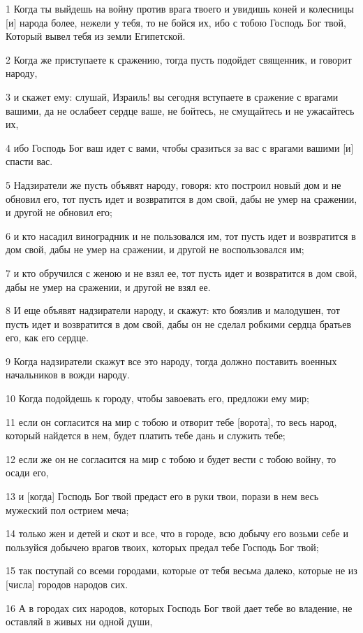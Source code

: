 \par 1 Когда ты выйдешь на войну против врага твоего и увидишь коней и колесницы [и] народа более, нежели у тебя, то не бойся их, ибо с тобою Господь Бог твой, Который вывел тебя из земли Египетской.
\par 2 Когда же приступаете к сражению, тогда пусть подойдет священник, и говорит народу,
\par 3 и скажет ему: слушай, Израиль! вы сегодня вступаете в сражение с врагами вашими, да не ослабеет сердце ваше, не бойтесь, не смущайтесь и не ужасайтесь их,
\par 4 ибо Господь Бог ваш идет с вами, чтобы сразиться за вас с врагами вашими [и] спасти вас.
\par 5 Надзиратели же пусть объявят народу, говоря: кто построил новый дом и не обновил его, тот пусть идет и возвратится в дом свой, дабы не умер на сражении, и другой не обновил его;
\par 6 и кто насадил виноградник и не пользовался им, тот пусть идет и возвратится в дом свой, дабы не умер на сражении, и другой не воспользовался им;
\par 7 и кто обручился с женою и не взял ее, тот пусть идет и возвратится в дом свой, дабы не умер на сражении, и другой не взял ее.
\par 8 И еще объявят надзиратели народу, и скажут: кто боязлив и малодушен, тот пусть идет и возвратится в дом свой, дабы он не сделал робкими сердца братьев его, как его сердце.
\par 9 Когда надзиратели скажут все это народу, тогда должно поставить военных начальников в вожди народу.
\par 10 Когда подойдешь к городу, чтобы завоевать его, предложи ему мир;
\par 11 если он согласится на мир с тобою и отворит тебе [ворота], то весь народ, который найдется в нем, будет платить тебе дань и служить тебе;
\par 12 если же он не согласится на мир с тобою и будет вести с тобою войну, то осади его,
\par 13 и [когда] Господь Бог твой предаст его в руки твои, порази в нем весь мужеский пол острием меча;
\par 14 только жен и детей и скот и все, что в городе, всю добычу его возьми себе и пользуйся добычею врагов твоих, которых предал тебе Господь Бог твой;
\par 15 так поступай со всеми городами, которые от тебя весьма далеко, которые не из [числа] городов народов сих.
\par 16 А в городах сих народов, которых Господь Бог твой дает тебе во владение, не оставляй в живых ни одной души,
